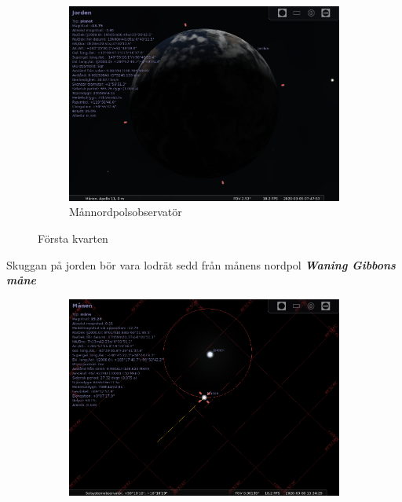 \documentclass[./exercises.tex]{subfiles}
\begin{document}
\begin{itemize}
\begin{figure}[H]
     \begin{subfigure}[b]{0.45\textwidth}
         \centering
         \includegraphics[width=\textwidth]{Stellarium1/FirstQuarter/stellarium-004.png}
         \caption{Månnordpolsobservatör}
         \label{fig:three sin x}
     \end{subfigure}
     \hfill
        \caption{ Första kvarten }
        \label{fig:perod graphs}
\end{figure}
Skuggan på jorden bör vara lodrät sedd från månens nordpol
\newpage
\textit{\textbf{Waning Gibbons måne}}
\begin{figure}[H]
     \centering
     \begin{subfigure}[b]{0.45\textwidth}
         \centering
         \includegraphics[width=\textwidth]{Stellarium1/WaningGibbons/stellarium-005.png}

\end{subfigure}
\end{figure}
\end{itemize}
\end{document}
